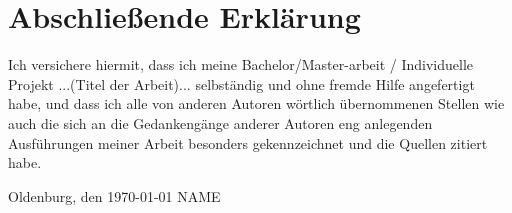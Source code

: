 \documentclass[11pt]{scrartcl}
\begin{document}
\clearpairofpagestyles

\section*{Abschließende Erklärung}
Ich versichere hiermit, dass ich meine Bachelor/Master-arbeit / Individuelle Projekt ...(Titel der Arbeit)... selbständig und ohne fremde Hilfe angefertigt habe, und dass ich alle von anderen Autoren wörtlich übernommenen Stellen wie auch die sich an die Gedankengänge anderer Autoren eng anlegenden Ausführungen meiner Arbeit besonders gekennzeichnet und die Quellen zitiert habe.

\vspace*{3cm}
\noindent Oldenburg, den \today \hspace*{2cm} NAME

\end{document}
